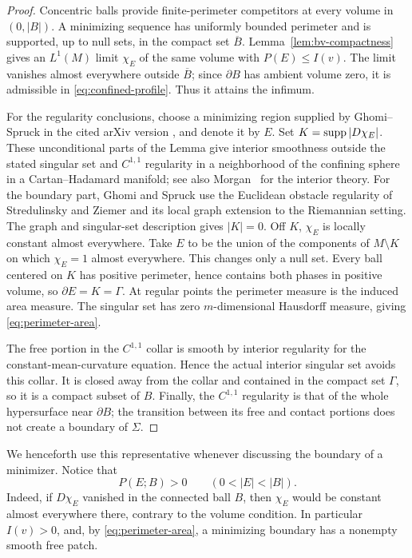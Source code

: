 \begin{proof}
Concentric balls provide finite-perimeter competitors at every volume
in $(0,|B|)$.  A minimizing sequence has uniformly bounded perimeter
and is supported, up to null sets, in the compact set $\overline B$.
Lemma~\ref{lem:bv-compactness} gives an $L^1(M)$ limit
$\chi_E$ of the same volume with $P(E)\le I(v)$.  The limit vanishes
almost everywhere outside $\overline B$; since $\partial B$ has
ambient volume zero, it is admissible in \eqref{eq:confined-profile}.
Thus it attains the infimum.

For the regularity conclusions, choose a minimizing region supplied by
Ghomi--Spruck in the cited arXiv version
\cite[Lemma~7.2(i),(ii), p.~35]{GhomiSpruck2022}, and denote it by $E$.
Set $K=\operatorname{supp}|D\chi_E|$. These unconditional parts of the Lemma give interior
smoothness outside the stated singular set and
$C^{1,1}$ regularity in a neighborhood of the confining sphere in a
Cartan--Hadamard manifold; see also
Morgan~\cite[Section~2 and Corollary~3.8]{Morgan2003} for the interior theory.
For the boundary part, Ghomi and Spruck use the Euclidean obstacle
regularity of Stredulinsky and Ziemer \cite{StredulinskyZiemer1997}
and its local graph extension to the Riemannian setting.
The graph and singular-set description gives $|K|=0$.
Off $K$, $\chi_E$ is locally constant almost everywhere.
Take $E$ to be the union of the components of $M\setminus K$ on which
$\chi_E=1$ almost everywhere.  This changes only a null set.
Every ball centered on $K$ has positive perimeter, hence contains both
phases in positive volume, so $\partial E=K=\Gamma$.
At regular points the perimeter measure is the induced area measure.
The singular set has zero $m$-dimensional Hausdorff measure, giving
\eqref{eq:perimeter-area}.

The free portion in the $C^{1,1}$ collar is smooth by interior
regularity for the constant-mean-curvature equation.  Hence the actual
interior singular set avoids this collar.  It is closed away from the
collar and contained in the compact set $\Gamma$, so it is a compact
subset of $B$.  Finally, the $C^{1,1}$ regularity is that of the whole
hypersurface near $\partial B$; the transition between its free and
contact portions does not create a boundary of $\Sigma$.
\end{proof}

We henceforth use this representative whenever discussing the boundary
of a minimizer.  Notice that
\begin{equation}
 \label{eq:positive-free-perimeter}
 P(E;B)>0 \qquad (0<|E|<|B|).
\end{equation}
Indeed, if $D\chi_E$ vanished in the connected ball $B$, then
$\chi_E$ would be constant almost everywhere there, contrary to the
volume condition.  In particular $I(v)>0$, and, by
\eqref{eq:perimeter-area}, a minimizing boundary has a nonempty smooth
free patch.

